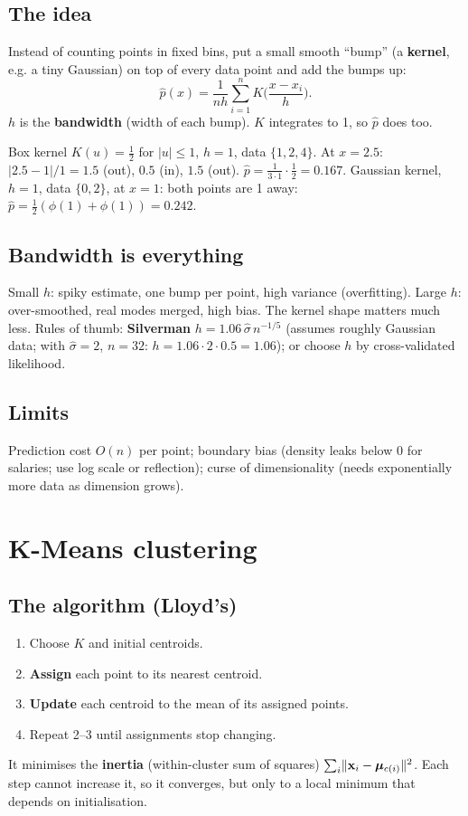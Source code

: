 \subsection{The idea}
Instead of counting points in fixed bins, put a small smooth ``bump'' (a \textbf{kernel}, e.g. a tiny Gaussian) on top of every data point
and add the bumps up:
\[ \hat p(x) = \frac{1}{nh}\sum_{i=1}^nK\Big(\frac{x - x_i}{h}\Big). \]
$h$ is the \textbf{bandwidth} (width of each bump). $K$ integrates to 1, so $\hat p$ does too.

\begin{example}
Box kernel $K(u) = \frac12$ for $|u|\le1$, $h = 1$, data $\{1, 2, 4\}$. At $x = 2.5$: $|2.5 - 1|/1 = 1.5$ (out), $0.5$ (in), $1.5$ (out).
$\hat p = \frac{1}{3\cdot1}\cdot\frac12 = 0.167$.
Gaussian kernel, $h = 1$, data $\{0, 2\}$, at $x = 1$: both points are 1 away: $\hat p = \frac{1}{2}(\phi(1) + \phi(1)) = 0.242$.
\end{example}

\subsection{Bandwidth is everything}
Small $h$: spiky estimate, one bump per point, high variance (overfitting). Large $h$: over-smoothed, real modes merged, high bias. The
kernel shape matters much less. Rules of thumb: \textbf{Silverman} $h = 1.06\,\hat\sigma\,n^{-1/5}$ (assumes roughly Gaussian data; with
$\hat\sigma = 2$, $n = 32$: $h = 1.06\cdot2\cdot0.5 = 1.06$); or choose $h$ by cross-validated likelihood.

\subsection{Limits}
Prediction cost $O(n)$ per point; boundary bias (density leaks below 0 for salaries; use log scale or reflection); curse of dimensionality
(needs exponentially more data as dimension grows).

\section{K-Means clustering}
\subsection{The algorithm (Lloyd's)}
\begin{enumerate}
\item Choose $K$ and initial centroids.
\item \textbf{Assign} each point to its nearest centroid.
\item \textbf{Update} each centroid to the mean of its assigned points.
\item Repeat 2--3 until assignments stop changing.
\end{enumerate}
It minimises the \textbf{inertia} (within-cluster sum of squares) $\sum_i\lVert \mathbf x_i - \boldsymbol\mu_{c(i)}\rVert^2$. Each step cannot increase it,
so it converges, but only to a local minimum that depends on initialisation.

